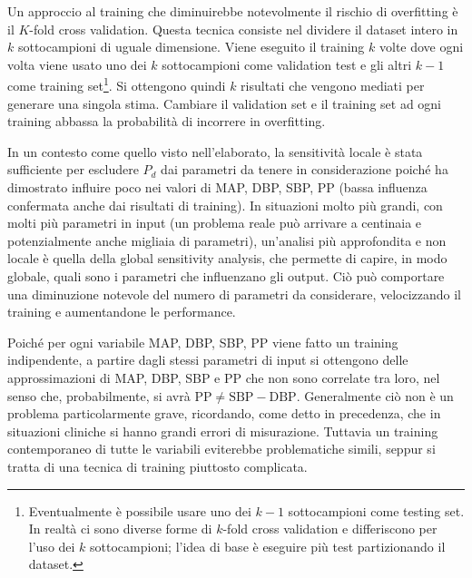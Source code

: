 Un approccio al training che diminuirebbe notevolmente il rischio di overfitting è il $K$-fold cross validation. Questa tecnica consiste nel dividere il dataset intero in $k$ sottocampioni di uguale dimensione. Viene eseguito il training $k$ volte dove ogni volta viene usato uno dei $k$ sottocampioni come validation test e gli altri $k-1$ come training set\footnote{Eventualmente è possibile usare uno dei $k-1$ sottocampioni come testing set. In realtà ci sono diverse forme di $k$-fold cross validation e differiscono per l'uso dei $k$ sottocampioni; l'idea di base è eseguire più test partizionando il dataset.}. Si ottengono quindi $k$ risultati che vengono mediati per generare una singola stima. Cambiare il validation set e il training set ad ogni training abbassa la probabilità di incorrere in overfitting.

In un contesto come quello visto nell'elaborato, la sensitività locale è stata sufficiente per escludere $P_d$ dai parametri da tenere in considerazione poiché ha dimostrato influire poco nei valori di MAP, DBP, SBP, PP (bassa influenza confermata anche dai risultati di training). In situazioni molto più grandi, con molti più parametri in input (un problema reale può arrivare a centinaia e potenzialmente anche migliaia di parametri), un'analisi più approfondita e non locale è quella della global sensitivity analysis, che permette di capire, in modo globale, quali sono i parametri che influenzano gli output. Ciò può comportare una diminuzione notevole del numero di parametri da considerare, velocizzando il training e aumentandone le performance.

Poiché per ogni variabile MAP, DBP, SBP, PP viene fatto un training indipendente, a partire dagli stessi parametri di input si ottengono delle approssimazioni di MAP, DBP, SBP e PP che non sono correlate tra loro, nel senso che, probabilmente, si avrà $\text{PP}\neq \text{SBP} - \text{DBP}$. Generalmente ciò non è un problema particolarmente grave, ricordando, come detto in precedenza, che in situazioni cliniche si hanno grandi errori di misurazione. Tuttavia un training contemporaneo di tutte le variabili eviterebbe problematiche simili, seppur si tratta di una tecnica di training piuttosto complicata.